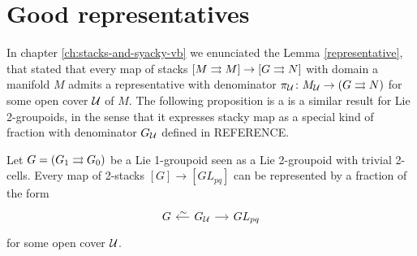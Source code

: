 %
%

\section{Good representatives}\label{sec:good-representatives}

In chapter \ref{ch:stacks-and-syacky-vb} we enunciated the Lemma \ref{representative}, that stated that every map of stacks $[M\rightrightarrows M]\to [G\rightrightarrows N]$ with domain a manifold $M$ admits a representative with denominator \( \pi_\mathcal U\colon M_\mathcal U \to (G\rightrightarrows N) \) for some open cover $\mathcal U$ of $M$.
The following proposition is a is a similar result for Lie 2-groupoids, in the sense that it expresses stacky map as a special kind of fraction with denominator $G_\mathcal U$ defined in REFERENCE.

\begin{prop}
Let $G = (G_1\rightrightarrows G_0)$ be a Lie 1-groupoid seen as a Lie 2-groupoid with trivial 2-cells.
Every map of 2-stacks $[G]\to [GL_{pq}]$ can be represented by a fraction of the form
\begin{equation}
\begin{tikzcd}[sep = small]
  G & G_\U \ar{l}[pos=.45, above]{\sim} \ar{r} & GL_{pq}
\end{tikzcd}
\end{equation}
for some open cover $\mathcal U$.
\end{prop}

